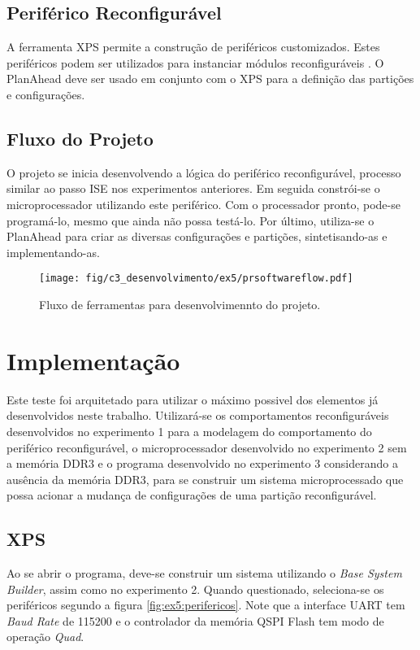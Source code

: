 \documentclass[11pt,a4paper,oneside]{book}
\begin{document}
\subsection{Periférico Reconfigurável}
A ferramenta XPS permite a construção de periféricos customizados.
Estes periféricos podem ser utilizados para instanciar módulos reconfiguráveis \cite{ug744}.
O PlanAhead deve ser usado em conjunto com o XPS para a definição das partições e configurações.

\subsection{Fluxo do Projeto}
O projeto se inicia desenvolvendo a lógica do periférico reconfigurável, processo similar ao passo ISE nos experimentos anteriores.
Em seguida constrói-se o microprocessador utilizando este periférico.
Com o processador pronto, pode-se programá-lo, mesmo que ainda não possa testá-lo.
Por último, utiliza-se o PlanAhead para criar as diversas configurações e partições, sintetisando-as e implementando-as. 

\begin{figure}[htp]
\centering
\texttt{[image: fig/c3\_desenvolvimento/ex5/prsoftwareflow.pdf]}
\caption{Fluxo de ferramentas para desenvolvimennto do projeto.}
\label{fig:ex5:prsoftwareflow}
\end{figure}

\section{Implementação}
Este teste foi arquitetado para utilizar o máximo possivel dos elementos já desenvolvidos  neste trabalho.
Utilizará-se os comportamentos reconfiguráveis desenvolvidos no experimento 1 para a modelagem do comportamento do periférico reconfigurável, o microprocessador desenvolvido no experimento 2 sem a memória DDR3 e o programa desenvolvido no experimento 3 considerando a ausência da memória DDR3, para se construir um sistema microprocessado que possa acionar a mudança de configurações de uma partição reconfigurável.

\subsection{XPS}
Ao se abrir o programa, deve-se construir um sistema utilizando o \textit{Base System Builder}, assim como no experimento 2.
Quando questionado, seleciona-se os periféricos segundo a figura \ref{fig:ex5:perifericos}.
Note que a interface UART tem \textit{Baud Rate} de 115200 e o controlador da memória QSPI Flash tem modo de operação \textit{Quad}.
\end{document}

